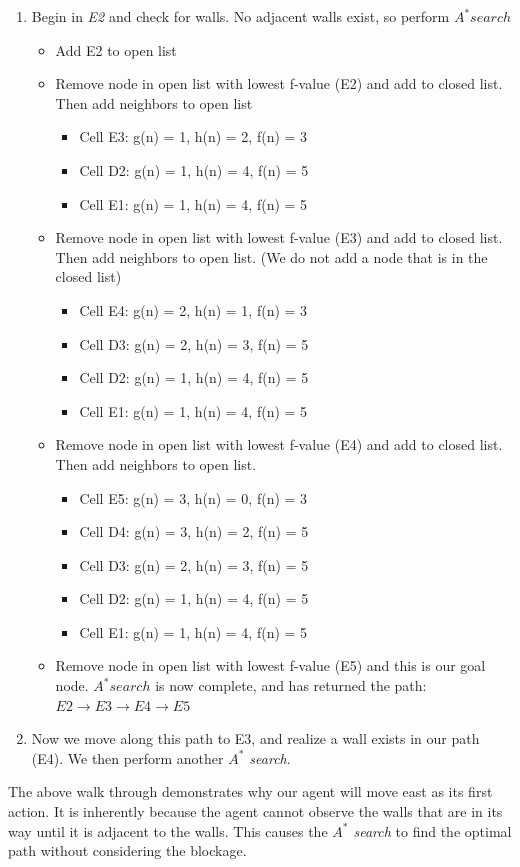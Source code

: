 \begin{enumerate}
  \item Begin in \emph{E2} and check for walls. No adjacent walls exist, so perform $A^* search$
    \begin{itemize}
    \item Add E2 to open list
    \item Remove node in open list with lowest f-value (E2) and add to closed list. Then add neighbors to open list
        \begin{itemize}
            \item Cell E3: g(n) = 1, h(n) = 2, f(n) = 3 
            \item Cell D2: g(n) = 1, h(n) = 4, f(n) = 5 
            \item Cell E1: g(n) = 1, h(n) = 4, f(n) = 5 
        \end{itemize}
        \item Remove node in open list with lowest f-value (E3) and add to closed list. Then add neighbors to open list. (We do not add a node that is in the closed list)
        \begin{itemize}
            \item Cell E4: g(n) = 2, h(n) = 1, f(n) = 3 
            \item Cell D3: g(n) = 2, h(n) = 3, f(n) = 5
            \item Cell D2: g(n) = 1, h(n) = 4, f(n) = 5 
            \item Cell E1: g(n) = 1, h(n) = 4, f(n) = 5 
        \end{itemize}
        \item Remove node in open list with lowest f-value (E4) and add to closed list. Then add neighbors to open list.
        \begin{itemize}
            \item Cell E5: g(n) = 3, h(n) = 0, f(n) = 3
            \item Cell D4: g(n) = 3, h(n) = 2, f(n) = 5
            \item Cell D3: g(n) = 2, h(n) = 3, f(n) = 5
            \item Cell D2: g(n) = 1, h(n) = 4, f(n) = 5 
            \item Cell E1: g(n) = 1, h(n) = 4, f(n) = 5
        \end{itemize}
        \item Remove node in open list with lowest f-value (E5) and this is our goal node. $A^* search$ is now complete, and has returned the path: $E2 \longrightarrow E3 \longrightarrow E4 \longrightarrow E5$
    \end{itemize}
    \item Now we move along this path to E3, and realize a wall exists in our path (E4). We then perform another \emph{$A^*$ search}.
\end{enumerate}
The above walk through demonstrates why our agent will move east as its first action. It is inherently because the agent cannot observe the walls that are in its way until it is adjacent to the walls. This causes the \emph{$A^*$ search} to find the optimal path without considering the blockage.


